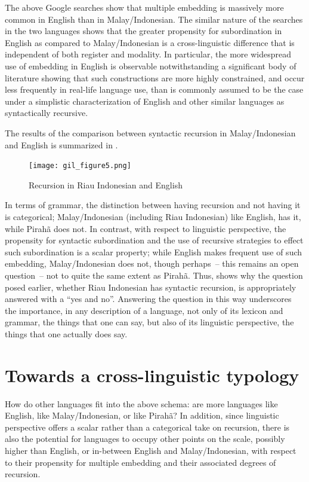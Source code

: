 \documentclass[output=paper,colorlinks,citecolor=brown
]{langscibook}
\begin{document}
The above Google searches show that multiple embedding is massively more common in English than in Malay\slash Indonesian.  The similar nature of the searches in the two languages shows that the greater propensity for subordination in English as compared to Malay\slash Indonesian is  a cross-linguistic difference that is independent of both register and modality.  In particular, the more widespread use of embedding in English is observable notwithstanding a significant body of literature \citep{karlsson2007aconstraints,karlsson2007bconstraints,karlsson2009aorigin,karlsson2009bsyntactic} showing that such constructions are more highly constrained, and occur less frequently in real-life language use, than is commonly assumed to be the case under a simplistic characterization of English and other similar languages as syntactically recursive.

The results of the comparison between syntactic recursion in Malay\slash Indonesian and English is summarized in .

\begin{figure}
\texttt{[image: gil\_figure5.png]}
\caption{\label{fig:gil:fig5}Recursion in Riau Indonesian and English}
\end{figure}

In terms of grammar, the distinction between having recursion and not having it is categorical; Malay\slash Indonesian (including Riau Indonesian) like English, has it, while Pirahã does not.  In contrast, with respect to linguistic perspective, the propensity for syntactic subordination and the use of recursive strategies to effect such subordination is a scalar property; while English makes frequent use of such embedding, Malay\slash Indonesian does not, though perhaps~– this remains an open question~– not to quite the same extent as Pirahã.  Thus,  shows why the question posed earlier, whether Riau Indonesian has syntactic recursion, is appropriately answered with a ``yes and no''.  Answering the question in this way underscores the importance, in any description of a language, not only of its lexicon and grammar, the things that one can say, but also of its linguistic perspective, the things that one actually does say.

\section{Towards a cross-linguistic typology}

How do other languages fit into the above schema: are more languages like English, like Malay\slash Indonesian, or like Pirahã?  In addition, since linguistic perspective offers a scalar rather than a categorical take on recursion, there is also the potential for languages to occupy other points on the scale, possibly higher than English, or in-between English and Malay\slash Indonesian, with respect to their propensity for multiple embedding and their associated degrees of recursion.
\end{document}
